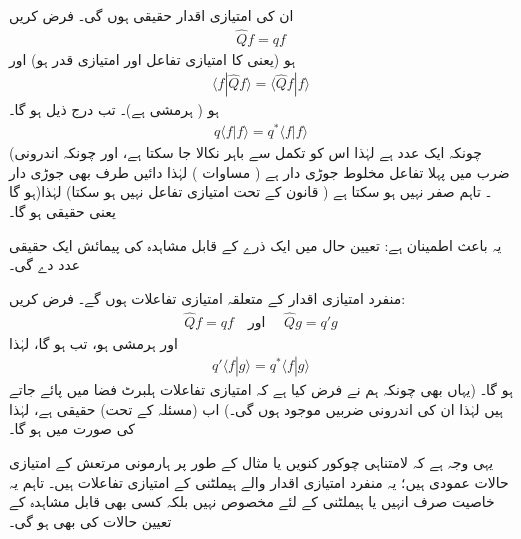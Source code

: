 ان کی امتیازی اقدار حقیقی ہوں گی۔ 
 فرض کریں
\begin{align*}
\hat{Q}f = qf 
\end{align*}
ہو (یعنی  کا امتیازی تفاعل  اور امتیازی قدر  ہو) اور 
\begin{align*}
\langle f | \hat{Q} f \rangle = \langle \hat{Q} f | f \rangle
\end{align*}
ہو ( ہرمشی ہے)۔ تب درج ذیل ہو گا۔
\begin{align*}
q\langle f \left\vert f \right. \rangle = q^{*} \langle f \left\vert f \right. \rangle
\end{align*}
(چونکہ  ایک عدد ہے لہٰذا اس کو تکمل سے باہر نکالا جا سکتا ہے، اور چونکہ اندرونی ضرب میں پہلا تفاعل مخلوط جوڑی دار ہے ( مساوات   ) لہٰذا دائیں طرف  بھی جوڑی دار ہو گا)۔ تاہم  صفر نہیں ہو سکتا ہے ( قانون کے تحت  امتیازی تفاعل نہیں ہو سکتا) لہٰذا  یعنی  حقیقی ہو گا۔

 یہ باعث اطمینان ہے: تعیین حال میں ایک ذرے کے قابل مشاہدہ کی پیمائش ایک حقیقی عدد دے گی۔ 
 
منفرد  امتیازی اقدار کے متعلقہ امتیازی تفاعلات  ہوں گے۔ 
 فرض کریں:
\begin{align*}
\hat{Q}f = qf \quad \text{اور }\quad \hat{Q}g=q'g
\end{align*}
اور   ہرمشی ہو،   تب  ہو گا،  لہٰذا
\begin{align*}
q' \langle f | g \rangle = q^{*} \langle f | g \rangle
\end{align*}
  ہو گا۔  (یہاں بھی چونکہ ہم نے فرض کیا ہے کہ امتیازی تفاعلات ہلبرٹ فضا میں پائے جاتے ہیں لہٰذا ان کی  اندرونی ضربیں موجود ہوں گی۔) اب (مسئلہ  کے تحت)  حقیقی ہے، لہٰذا  کی صورت میں  ہو گا۔ 

یہی وجہ ہے کہ لامتناہی چوکور  کنویں یا مثال کے طور پر ہارمونی مرتعش کے امتیازی حالات عمودی ہیں؛ یہ منفرد امتیازی اقدار والے ہیملٹنی کے امتیازی تفاعلات ہیں۔ تاہم یہ خاصیت صرف انہیں یا ہیملٹنی کے لئے مخصوص نہیں بلکہ کسی بھی قابل مشاہدہ کے تعیین حالات کی بھی ہو گی۔

